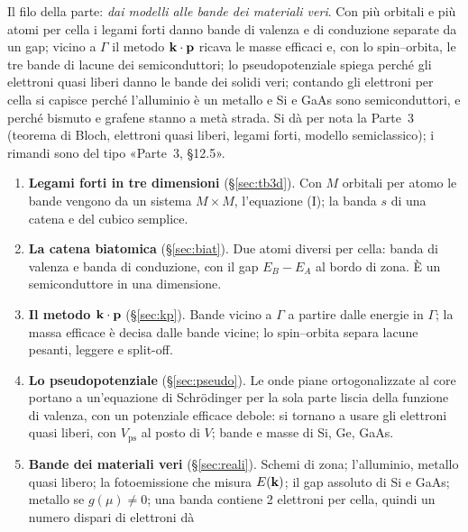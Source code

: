 \documentclass[11pt,a4paper]{article}
\begin{document}
{\small\setlength{\cftbeforesecskip}{4pt}\setlength{\cftbeforesubsecskip}{0.5pt}\tableofcontents}
\newpage

\begin{introduzione}
Il filo della parte: \emph{dai modelli alle bande dei materiali veri}. Con più orbitali e più atomi per cella i legami forti danno bande di valenza e
di conduzione separate da un gap; vicino a $\Gamma$ il metodo $\mathbf k\cdot\mathbf p$ ricava le masse efficaci e, con lo spin--orbita, le tre bande di
lacune dei semiconduttori; lo pseudopotenziale spiega perché gli elettroni quasi liberi danno le bande dei solidi veri; contando gli elettroni per cella
si capisce perché l'alluminio è un metallo e Si e GaAs sono semiconduttori, e perché bismuto e grafene stanno a metà strada. Si dà per nota la Parte~3 (teorema di Bloch, elettroni quasi liberi, legami forti, modello semiclassico); i rimandi sono
del tipo «Parte~3, §12.5».
\begin{enumerate}[label=\textbf{\Alph*.}, leftmargin=2.2em]
\item \textbf{Legami forti in tre dimensioni} (§\ref{sec:tb3d}). Con $M$ orbitali per atomo le bande vengono da un sistema $M\times M$, l'equazione
(I); la banda $s$ di una catena e del cubico semplice.
\item \textbf{La catena biatomica} (§\ref{sec:biat}). Due atomi diversi per cella: banda di valenza e banda di conduzione, con il gap $E_B-E_A$ al
bordo di zona. È un semiconduttore in una dimensione.
\item \textbf{Il metodo $\mathbf k\cdot\mathbf p$} (§\ref{sec:kp}). Bande vicino a $\Gamma$ a partire dalle energie in $\Gamma$; la massa efficace è decisa
dalle bande vicine; lo spin--orbita separa lacune pesanti, leggere e split-off.
\item \textbf{Lo pseudopotenziale} (§\ref{sec:pseudo}). Le onde piane ortogonalizzate al core portano a un'equazione di Schrödinger per la sola
parte liscia della funzione di valenza, con un potenziale efficace debole: si tornano a usare gli elettroni quasi liberi, con $V_{\mathrm{ps}}$ al posto
di $V$; bande e masse di Si, Ge, GaAs.
\item \textbf{Bande dei materiali veri} (§\ref{sec:reali}). Schemi di zona; l'alluminio, metallo quasi libero; la fotoemissione che misura
$E(\mathbf k)$; il gap assoluto di Si e GaAs; metallo se $g(\mu)\ne0$; una banda contiene 2 elettroni per cella, quindi un numero dispari di elettroni dà

\end{enumerate}
\end{introduzione}
\end{document}
